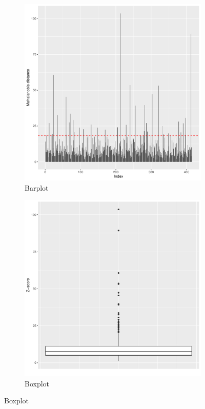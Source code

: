 \documentclass[a4paper, 12pt]{article}
\begin{document}
    \begin{figure}[h]
        \begin{subfigure}{.48\textwidth}
          \centering
          \includegraphics[height=0.9\textwidth]{resources/pdf/mahalanobis.pdf}
          \caption{Barplot}
          \label{fig:mahalanobis}
        \end{subfigure}
        \hspace{0.5em}
        \begin{subfigure}{.48\textwidth}
          \centering
          \includegraphics[height=0.9\textwidth]{resources/pdf/mahalanobis_boxplot.pdf}
          \caption{Boxplot}
          \label{fig:mahalanobis_boxplot}
        \end{subfigure}
        \label{fig:wind}
    \end{figure}
    \newpage
    \appendix
\end{document}
